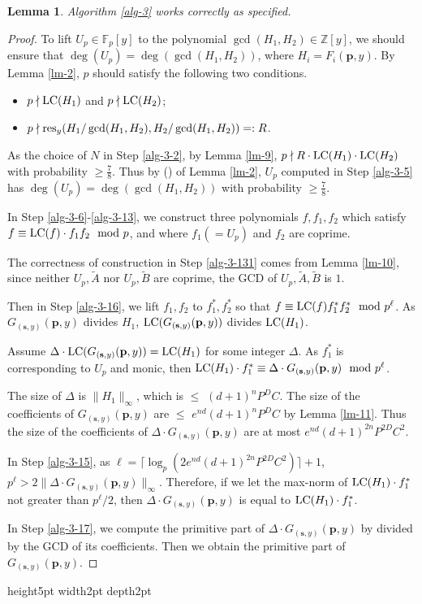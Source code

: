 \documentclass[final,20pt]{elsarticle}
\newtheorem{lemma}[theorem]{Lemma}
\def\Z{{\mathbb Z}}
\def\F{{\mathbb{F}}}
\def\res{\hbox{\rm{res}}}
\def\LC{\hbox{\rm{LC}}}
\def\qed{\hfil {\vrule height5pt width2pt depth2pt}}
\begin{document}
\begin{lemma}\label{lm-15}
Algorithm \ref{alg-3} works correctly as specified.
\end{lemma}
\begin{proof}
To lift $U_p\in \F_p[y]$ to the  polynomial $\gcd(H_1,H_2)\in \Z[y]$, we should ensure that $\deg(U_p)=\deg (\gcd(H_1,H_2))$, where $H_i=F_i(\mathbf{p},y)$.
%
By Lemma \ref{lm-2}, $p$ should satisfy the following two conditions.
\begin{itemize}
\item $p\nmid \LC(H_1)$ and $p\nmid \LC(H_2)$;
\item $p\nmid \res_y(H_1/\gcd(H_1,H_2),H_2/\gcd(H_1,H_2))=:R$.
\end{itemize}

As the choice of $N$ in Step \ref{alg-3-2}, by Lemma \ref{lm-9},  $p\nmid R\cdot \LC(H_1)\cdot \LC(H_2)$ with probability $\geq \frac{7}{8}$.
%
Thus by (\lowercase\expandafter{}) of Lemma \ref{lm-2}, $U_p$ computed in Step \ref{alg-3-5} has $\deg(U_p)=\deg (\gcd(H_1,H_2))$ with probability $\geq \frac78$.

In Step \ref{alg-3-6}-\ref{alg-3-13}, we construct three polynomials $f,f_1,f_2$ which satisfy $f\equiv\LC(f)\cdot f_1f_2 \mod p$, and where $f_1(=U_p)$ and $f_2$ are coprime.

The correctness of construction in Step \ref{alg-3-131} comes from Lemma \ref{lm-10}, since neither $U_p,\widetilde{A}$ nor $U_p,\widetilde{B}$ are coprime, the GCD of $U_p,\widetilde{A},\widetilde{B}$ is $1$.

Then in Step \ref{alg-3-16}, we lift $f_1,f_2$ to $f^*_1,f^*_2$ so that $f\equiv \LC(f)f^*_1f^*_2 \mod p^{\ell}$. As $G_{(\mathbf{s},y)}(\mathbf{p},y)$ divides $H_1$, $\LC(G_{(\mathbf{s},y)}(\mathbf{p},y))$ divides $\LC(H_1)$. 

Assume $\Delta\cdot \LC(G_{(\mathbf{s},y)}(\mathbf{p},y))=\LC(H_1)$ for some integer $\Delta$.
%
As $f^*_1$ is corresponding to $U_p$ and monic, then $\LC(H_1)\cdot f^*_1\equiv \Delta\cdot G_{(\mathbf{s},y)}(\mathbf{p},y)\mod p^{\ell}$.

The size of $\Delta$ is $\|H_1\|_{\infty}$, which is  $\le$ $(d+1)^nP^DC$. The size of the coefficients of $G_{(\mathbf{s},y)}(\mathbf{p},y)$ are $\le$ $e^{nd}(d+1)^nP^{D}C$ by Lemma \ref{lm-11}. Thus the size of the coefficients of $\Delta\cdot G_{(\mathbf{s},y)}(\mathbf{p},y)$ are at most $e^{nd}(d+1)^{2n}P^{2D}C^2$.

In Step \ref{alg-3-15}, as $\ell=\lceil\log _p (2e^{nd}(d+1)^{2n}P^{2D}C^2)\rceil+1$,
$p^{\ell}> 2\|\Delta\cdot G_{(\mathbf{s},y)}(\mathbf{p},y)\|_{\infty}$.
%
Therefore, if we let the max-norm of $\LC(H_1)\cdot f^*_1$ not greater than $p^{\ell}/2$, then $\Delta\cdot G_{(\mathbf{s},y)}(\mathbf{p},y)$ is equal to $\LC(H_1)\cdot f^*_1$.

In Step \ref{alg-3-17}, we compute the primitive part of $\Delta\cdot G_{(\mathbf{s},y)}(\mathbf{p},y)$ by divided by the GCD of its coefficients. Then we obtain the primitive part of $G_{(\mathbf{s},y)}(\mathbf{p},y)$.
\end{proof}\qed
\end{document}
